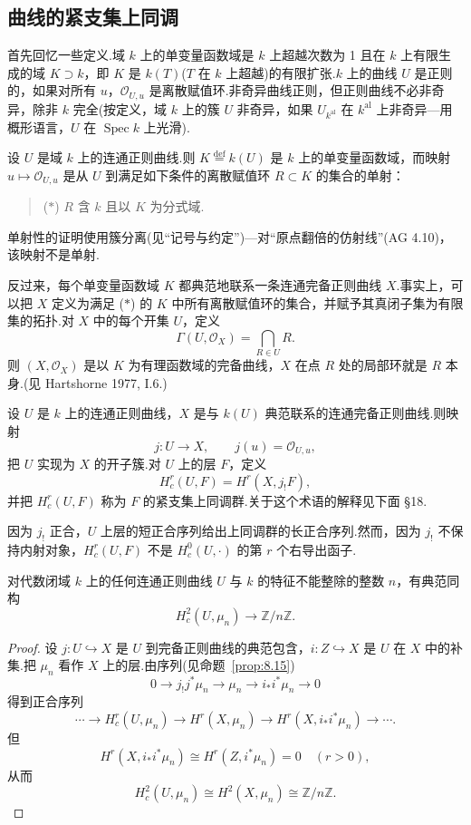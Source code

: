\subsection*{曲线的紧支集上同调}

首先回忆一些定义.域 $k$ 上的单变量函数域是 $k$ 上超越次数为 1 且在 $k$ 上有限生成的域 $K \supset k$，即 $K$ 是 $k(T)$($T$ 在 $k$ 上超越)的有限扩张.$k$ 上的曲线 $U$ 是正则的，如果对所有 $u$，$\mathcal{O}_{U, u}$ 是离散赋值环.非奇异曲线正则，但正则曲线不必非奇异，除非 $k$ 完全(按定义，域 $k$ 上的簇 $U$ 非奇异，如果 $U_{k^{\mathrm{al}}}$ 在 $k^{\mathrm{al}}$ 上非奇异---用概形语言，$U$ 在 $\operatorname{Spec} k$ 上光滑).

设 $U$ 是域 $k$ 上的连通正则曲线.则 $K \overset{\mathrm{def}}{=} k(U)$ 是 $k$ 上的单变量函数域，而映射 $u \mapsto \mathcal{O}_{U, u}$ 是从 $U$ 到满足如下条件的离散赋值环 $R \subset K$ 的集合的单射：
\begin{quote}
($\ast$) $R$ 含 $k$ 且以 $K$ 为分式域.
\end{quote}
单射性的证明使用簇分离(见``记号与约定'')---对``原点翻倍的仿射线''(AG 4.10)，该映射不是单射.

反过来，每个单变量函数域 $K$ 都典范地联系一条连通完备正则曲线 $X$.事实上，可以把 $X$ 定义为满足 ($\ast$) 的 $K$ 中所有离散赋值环的集合，并赋予其真闭子集为有限集的拓扑.对 $X$ 中的每个开集 $U$，定义
\[
\Gamma(U, \mathcal{O}_X) = \bigcap_{R \in U} R.
\]
则 $(X, \mathcal{O}_X)$ 是以 $K$ 为有理函数域的完备曲线，$X$ 在点 $R$ 处的局部环就是 $R$ 本身.(见 Hartshorne 1977, I.6.)

设 $U$ 是 $k$ 上的连通正则曲线，$X$ 是与 $k(U)$ 典范联系的连通完备正则曲线.则映射
\[
j \colon U \to X, \qquad j(u) = \mathcal{O}_{U, u},
\]
把 $U$ 实现为 $X$ 的开子簇.对 $U$ 上的层 $F$，定义
\[
H^{r}_{c}(U, F) = H^{r}(X, j_{!}F),
\]
并把 $H^{r}_{c}(U, F)$ 称为 $F$ 的紧支集上同调群.关于这个术语的解释见下面 \S 18.

因为 $j_{!}$ 正合，$U$ 上层的短正合序列给出上同调群的长正合序列.然而，因为 $j_{!}$ 不保持内射对象，$H^{r}_{c}(U, F)$ 不是 $H^{0}_{c}(U, \cdot)$ 的第 $r$ 个右导出函子.

\begin{proposition}\label{prop:14.5}
对代数闭域 $k$ 上的任何连通正则曲线 $U$ 与 $k$ 的特征不能整除的整数 $n$，有典范同构
\[
H^{2}_{c}(U, \mu_n) \to \mathbb{Z}/n\mathbb{Z}.
\]
\end{proposition}

\begin{proof}
设 $j \colon U \hookrightarrow X$ 是 $U$ 到完备正则曲线的典范包含，$i \colon Z \hookrightarrow X$ 是 $U$ 在 $X$ 中的补集.把 $\mu_n$ 看作 $X$ 上的层.由序列(见命题~\ref{prop:8.15})
\[
0 \to j_{!}j^{*}\mu_n \to \mu_n \to i_{*}i^{*}\mu_n \to 0
\]
得到正合序列
\[
\cdots \to H^{r}_{c}(U, \mu_n) \to H^{r}(X, \mu_n) \to H^{r}(X, i_{*}i^{*}\mu_n) \to \cdots.
\]
但
\[
H^{r}(X, i_{*}i^{*}\mu_n) \cong H^{r}(Z, i^{*}\mu_n) = 0 \quad (r > 0),
\]
从而
\[
H^{2}_{c}(U, \mu_n) \cong H^{2}(X, \mu_n) \cong \mathbb{Z}/n\mathbb{Z}.
\]
\end{proof}

